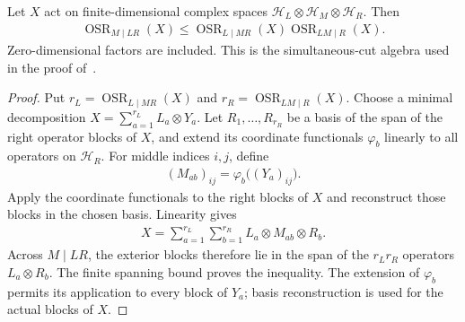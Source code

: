 \begin{theorem}
    \label{thm:operator_schmidt_middle_rank}
    \leanok
    Let $X$ act on finite-dimensional complex spaces
    $\mathcal H_L\otimes\mathcal H_M\otimes\mathcal H_R$. Then
    \begin{align*}
        \operatorname{OSR}_{M\mid LR}(X)
            \le \operatorname{OSR}_{L\mid MR}(X)
                \operatorname{OSR}_{LM\mid R}(X).
    \end{align*}
    Zero-dimensional factors are included. This is the simultaneous-cut
    algebra used in the proof of~\cite[Proposition~5.7]{Arad2016RigorousRG}.
\end{theorem}
\begin{proof}
    \leanok
    Put $r_L=\operatorname{OSR}_{L\mid MR}(X)$ and
    $r_R=\operatorname{OSR}_{LM\mid R}(X)$.
    Choose a minimal decomposition $X=\sum_{a=1}^{r_L}L_a\otimes Y_a$.
    Let $R_1,\ldots,R_{r_R}$ be a basis of the span of the right operator
    blocks of $X$, and extend its coordinate functionals $\varphi_b$ linearly
    to all operators on $\mathcal H_R$. For middle indices $i,j$, define
    \begin{align*}
        (M_{ab})_{ij}=\varphi_b\bigl((Y_a)_{ij}\bigr).
    \end{align*}
    Apply the coordinate functionals to the right blocks of $X$ and reconstruct
    those blocks in the chosen basis. Linearity gives
    \begin{align*}
        X=\sum_{a=1}^{r_L}\sum_{b=1}^{r_R}L_a\otimes M_{ab}\otimes R_b.
    \end{align*}
    Across $M\mid LR$, the exterior blocks therefore lie in the span of the
    $r_Lr_R$ operators $L_a\otimes R_b$. The finite spanning bound proves
    the inequality. The extension of $\varphi_b$ permits its application to
    every block of $Y_a$; basis reconstruction is used for the actual blocks of $X$.
\end{proof}

